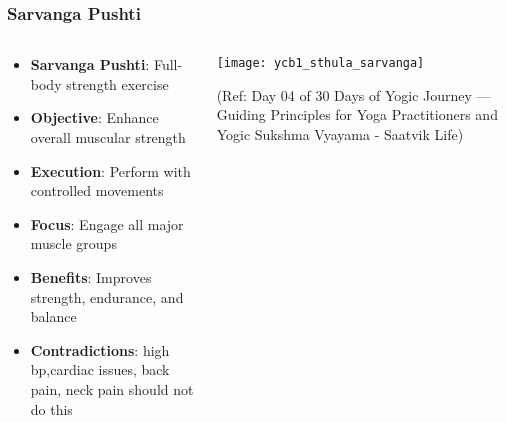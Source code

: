 
\begin{frame}[fragile]\frametitle{Sarvanga Pushti}
\begin{columns}
    \begin{column}[T]{0.5\linewidth}
      \begin{itemize}
		\item \textbf{Sarvanga Pushti}: Full-body strength exercise
		\item \textbf{Objective}: Enhance overall muscular strength
		\item \textbf{Execution}: Perform with controlled movements
		\item \textbf{Focus}: Engage all major muscle groups
		\item \textbf{Benefits}: Improves strength, endurance, and balance
		\item \textbf{Contradictions}: {high bp,cardiac issues, back pain, neck pain} should not do this
	  \end{itemize}
    \end{column}
    \begin{column}[T]{0.5\linewidth}
		\begin{center}
		\texttt{[image: ycb1\_sthula\_sarvanga]}
		
		{\tiny (Ref: Day 04 of 30 Days of Yogic Journey — Guiding Principles for Yoga Practitioners and Yogic Sukshma Vyayama - Saatvik Life)}	
		\end{center}	
    \end{column}
\end{columns}
\end{frame}

